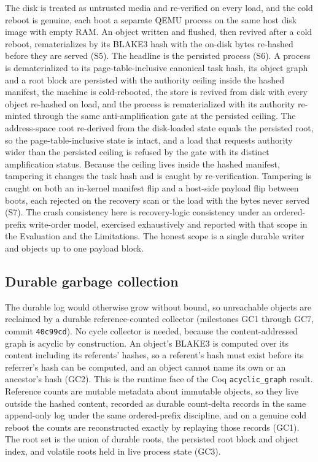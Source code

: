 \documentclass[10pt,twocolumn]{article}
\begin{document}
The disk is treated as untrusted media and re-verified on every load, and the
cold reboot is genuine, each boot a separate QEMU process on the same host disk
image with empty RAM. An object written and flushed, then revived after a cold
reboot, rematerializes by its BLAKE3 hash with the on-disk bytes re-hashed before
they are served (S5). The headline is the persisted process (S6). A process is
dematerialized to its page-table-inclusive canonical task hash, its object graph
and a root block are persisted with the authority ceiling inside the hashed
manifest, the machine is cold-rebooted, the store is revived from disk with every
object re-hashed on load, and the process is rematerialized with its authority
re-minted through the same anti-amplification gate at the persisted ceiling. The
address-space root re-derived from the disk-loaded state equals the persisted
root, so the page-table-inclusive state is intact, and a load that requests
authority wider than the persisted ceiling is refused by the gate with its
distinct amplification status. Because the ceiling lives inside the hashed
manifest, tampering it changes the task hash and is caught by re-verification.
Tampering is caught on both an in-kernel manifest flip and a host-side payload
flip between boots, each rejected on the recovery scan or the load with the bytes
never served (S7). The crash consistency here is recovery-logic consistency under
an ordered-prefix write-order model, exercised exhaustively and reported with that
scope in the Evaluation and the Limitations. The honest scope is a single durable
writer and objects up to one payload block.

\subsection{Durable garbage collection}

The durable log would otherwise grow without bound, so unreachable objects are
reclaimed by a durable reference-counted collector (milestones GC1 through GC7,
commit \texttt{40c99cd}). No cycle collector is needed, because the
content-addressed graph is acyclic by construction. An object's BLAKE3 is computed
over its content including its referents' hashes, so a referent's hash must exist
before its referrer's hash can be computed, and an object cannot name its own or
an ancestor's hash (GC2). This is the runtime face of the Coq \texttt{acyclic\_graph}
result. Reference counts are mutable metadata about immutable objects, so they
live outside the hashed content, recorded as durable count-delta records in the
same append-only log under the same ordered-prefix discipline, and on a genuine
cold reboot the counts are reconstructed exactly by replaying those records (GC1).
The root set is the union of durable roots, the persisted root block and object
index, and volatile roots held in live process state (GC3).
\end{document}

